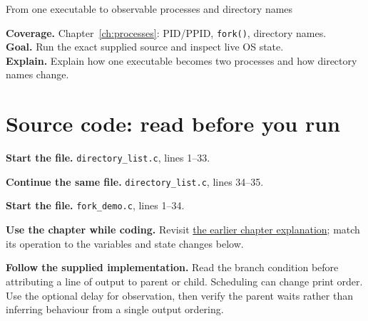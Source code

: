 \begin{labproject}{From one executable to observable processes and directory names}

\textbf{Coverage.} Chapter~\ref{ch:processes}: PID/PPID, \texttt{fork()}, directory names.\\
\textbf{Goal.} Run the exact supplied source and inspect live OS state.\\
\textbf{Explain.} Explain how one executable becomes two processes and how directory names change.




\section*{Source code: read before you run}
\noindent\textbf{Start the file.} \texttt{directory\_list.c}, lines 1--33.



\noindent\textbf{Continue the same file.} \texttt{directory\_list.c}, lines 34--35.


\noindent\textbf{Start the file.} \texttt{fork\_demo.c}, lines 1--34.


\textbf{Use the chapter while coding.} Revisit \hyperref[ch:processes]{the earlier chapter explanation}; match its operation to the variables and state changes below.

\textbf{Follow the supplied implementation.} Read the branch condition before attributing a line of output to parent or child. Scheduling can change print order. Use the optional delay for observation, then verify the parent waits rather than inferring behaviour from a single output ordering.





\end{labproject}
